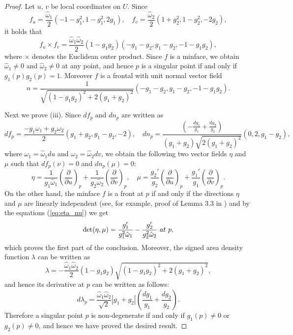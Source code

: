 \documentclass[11pt,reqno]{amsart}
\theoremstyle{plain} %
\theoremstyle{definition}
\begin{document}
\begin{proof}
Let $u$, $v$ be local coordinates on $U$. Since 
\begin{equation*}
f_u=\frac{\hat{\omega}_1}{2}(-1-g_1^2, 1-g_1^2, 2g_1),\quad f_v=\frac{\hat{\omega}_2}{2}(1+g_2^2, 1-g_2^2, -2g_2),
\end{equation*}
it holds that
\begin{equation*}
f_u\times f_v =\frac{\hat{\omega}_1\hat{\omega}_2}{2}(1-g_1g_2)(-g_1-g_2,g_1-g_2,-1-g_1g_2),
\end{equation*}
where $\times$ denotes the Euclidean outer product. Since $f$ is a minface, we obtain $\hat{\omega}_1\neq 0$ and $\hat{\omega}_2\neq 0$ at any point, and hence $p$ is a singular point if and only if $g_1(p)g_2(p)=1$. Moreover $f$ is a frontal with unit normal vector field
\begin{equation*}
n=\frac{1}{\sqrt{(1-g_1g_2)^2+2(g_1+g_2)^2}}(-g_1-g_2,g_1-g_2,-1-g_1g_2).
\end{equation*}

Next we prove (iii). Since $df_p$ and $dn_p$ are written as
\begin{equation*}
df_p=\frac{-g_1\omega_1+g_2\omega_2}{2}(g_1+g_2,g_1-g_2,-2),\quad dn_p=\frac{\left(-\frac{dg_1}{g_1}+\frac{dg_2}{g_2}\right)}{(g_1+g_2)\sqrt{2(g_1+g_2)^2}}(0,2,g_1-g_2),
\end{equation*}
where $\omega_1=\hat{\omega}_1du$ and $\omega_2=\hat{\omega}_2dv$, we obtain the following two vector fields $\eta$ and $\mu$ such that $df_p(\nu)=0$ and $dn_p(\mu)=0$:
\begin{equation}\label{eq:eta_nu}
\eta=\frac{1}{g_1\hat{\omega}_1}\left(\frac{\partial}{\partial u}\right)_p+\frac{1}{g_2\hat{\omega}_2}\left(\frac{\partial}{\partial v}\right)_p,\quad \mu=\frac{g_2'}{g_2}\left(\frac{\partial}{\partial u}\right)_p+\frac{g_1'}{g_1}\left(\frac{\partial}{\partial v}\right)_p.
\end{equation}
On the other hand, the minface $f$ is a front at $p$  if and only if the directions $\eta$ and $\mu$ are linearly independent (see, for example, proof of Lemma 3.3 in \cite{UY}) and by the equations (\ref{eq:eta_nu}) we get
\begin{equation*}
\det(\eta, \mu)=\frac{g_1'}{g_1^2\hat{\omega}_1}-\frac{g_2'}{g_2^2\hat{\omega}_2} {\text \ at\ }p, 
\end{equation*}
which proves the first part of the conclusion. Moreover, the signed area density function $\lambda$ can be written as 
\begin{equation*}
\lambda=-\frac{\hat{\omega}_1\hat{\omega}_2}{2}(1-g_1g_2)\sqrt{(1-g_1g_2)^2+2(g_1+g_2)^2},
\end{equation*}
and hence its derivative at $p$ can be written as follows:%
\begin{equation}\label{eq:dlambda}
d\lambda_p=\frac{\hat{\omega}_1\hat{\omega}_2}{\sqrt{2}}|g_1+g_2|\left(\frac{dg_1}{g_1}+\frac{dg_2}{g_2}\right).
\end{equation}
Therefore a singular point $p$ is non-degenerate if and only if $g_1(p)\neq0$ or $g_2(p)\neq0$, and hence we have proved the desired result.
\end{proof}
\end{document}
